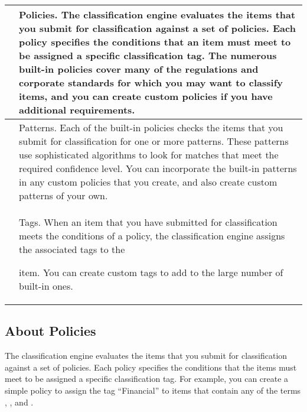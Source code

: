 \documentclass[letterpaper,10pt,english]{sphinxmanual}
\begin{document}
\begin{savenotes}\sphinxattablestart
\centering
\begin{tabulary}{\linewidth}[t]{|T|T|}
\hline
\begin{sphinxfigure-in-table}
\centering

\noindent{}
\end{sphinxfigure-in-table}\relax
&
Policies. The classification engine evaluates the items that you submit for
classification against a set of policies. Each policy specifies the conditions that
an item must meet to be assigned a specific classification tag.
The numerous built-in policies cover many of the regulations and corporate
standards for which you may want to classify items, and you can create custom
policies if you have additional requirements.
\\
\hline\begin{sphinxfigure-in-table}
\centering

\noindent{}
\end{sphinxfigure-in-table}\relax
&
Patterns. Each of the built-in policies checks the items that you submit for
classification for one or more patterns. These patterns use sophisticated
algorithms to look for matches that meet the required confidence level. You can
incorporate the built-in patterns in any custom policies that you create, and also
create custom patterns of your own.
\\
\hline\begin{sphinxfigure-in-table}
\centering

\noindent{}
\end{sphinxfigure-in-table}\relax
&
Tags. When an item that you have submitted for classification meets the conditions
of a policy, the classification engine assigns the associated tags to the

item. You can create custom tags to add to the large number of built-in ones.
\\
\hline
\end{tabulary}
\par
\sphinxattableend\end{savenotes}


\subsection{About Policies}
\label{\detokenize{mcdmp_app_ug:about-policies}}
The classification engine evaluates the items that you submit for classification against a set of policies. Each policy specifies the conditions that the items must meet to be assigned a specific classification tag. For example, you can create a simple policy to assign the tag “Financial” to items that contain any of the terms , , and .
\end{document}
